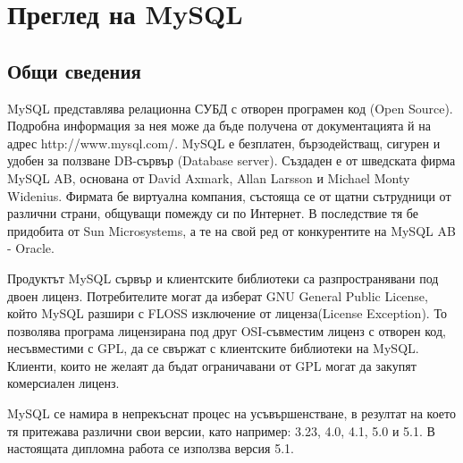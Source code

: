 \section{Преглед на MySQL}
\subsection{Общи сведения}
MySQL представлява релационна СУБД с отворен програмен код (Open
Source). Подробна информация за нея може да бъде получена от
документацията й на адрес http://www.mysql.com/. MySQL е безплатен,
бързодействащ, сигурен и удобен за ползване DB-сървър (Database
server). Създаден е от шведската фирма MySQL AB, основана от David
Axmark, Allan Larsson и Michael Monty Widenius. Фирмата бе виртуална
компания, състояща се от щатни сътрудници от различни страни, общуващи
помежду си по Интернет. В последствие тя бе придобита от Sun
Microsystems, а те на свой ред от конкурентите на MySQL AB - Oracle.

Продуктът MySQL сървър и клиентските библиотеки са разпространявани
под двоен лиценз. Потребителите могат да изберат GNU General Public
License, който MySQL разшири с FLOSS изключение от лиценза(License
Exception). То позволява програма лицензирана под друг OSI-съвместим
лиценз с отворен код, несъвместими с GPL, да се свържат с клиентските
библиотеки на MySQL. Клиенти, които не желаят да бъдат
ограничавани от GPL могат да закупят комерсиален лиценз.

MySQL се намира в непрекъснат процес на усъвършенстване, в резултат на
което тя притежава различни свои версии, като например: 3.23, 4.0,
4.1, 5.0 и 5.1. В настоящата дипломна работа се използва версия 5.1.

